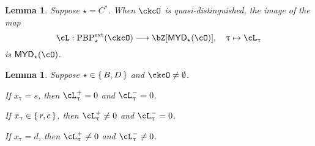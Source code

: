 \documentclass[12pt,a4paper]{amsart}
\def\MYD{{\mathsf{MYD}}}
\def\ac{\cL}
\numberwithin{equation}{section}
\newtheorem{lem}[thm]{Lemma}
\theoremstyle{remark}
\def\PBPes{\mathrm{PBP}^{\mathrm{ext}}_{\star}}
\begin{document}
\begin{lem}\label{lem:C*}
Suppose $\star = C^{*}$.
  When $\ckcO$ is quasi-distinguished, the image of the map
    \[
 \acm: \PBPes( \ckcO )\longrightarrow \bZ[\MYD_{\star}(\cO)],
      \quad \uptau\mapsto \ac_{\uptau}
    \]
    is $\MYD_{\star}(\cO)$.
\end{lem}

\begin{lem}\label{lem:BD2}
Suppose $\star \in \set{B,D}$ and $\ckcO \neq \emptyset$.
\begin{enuma}
  \item If $x_{\uptau}=s$, then $\ac_{\uptau}^{+} =0$ and $\ac_{\uptau}^{-}=0$.
  \item If $x_{\uptau}\in \set{r,c}$, then $\ac_{\uptau}^{+} \neq 0$ and $\ac_{\uptau}^{-}=0$.
  \item If $x_{\uptau}=d$, then $\ac_{\uptau}^{+} \neq 0$ and
  $\ac_{\uptau}^{-}\neq 0$.
\end{enuma}
\end{lem}
\end{document}
